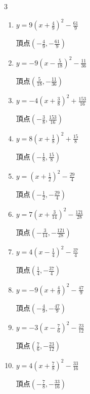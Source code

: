\begin{multicols}{3}
\begin{enumerate}
  \item $\displaystyle y=9\left( x+\frac{4}{9}\right)^{2}-\frac{61}{9}$

        $\displaystyle 頂点\left( -\frac{4}{9} , -\frac{61}{9} \right)$

  \item $\displaystyle y=-9\left( x-\frac{5}{18}\right)^{2}-\frac{11}{36}$

        $\displaystyle 頂点\left( \frac{5}{18} , -\frac{11}{36} \right)$

  \item $\displaystyle y=-4\left( x+\frac{3}{8}\right)^{2}+\frac{153}{16}$

        $\displaystyle 頂点\left( -\frac{3}{8} , \frac{153}{16} \right)$

  \item $\displaystyle y=8\left( x+\frac{1}{8}\right)^{2}+\frac{15}{8}$

        $\displaystyle 頂点\left( -\frac{1}{8} , \frac{15}{8} \right)$

  \item $\displaystyle y=\left( x+\frac{1}{2}\right)^{2}-\frac{29}{4}$

        $\displaystyle 頂点\left( -\frac{1}{2} , -\frac{29}{4} \right)$

  \item $\displaystyle y=7\left( x+\frac{3}{14}\right)^{2}-\frac{121}{28}$

        $\displaystyle 頂点\left( -\frac{3}{14} , -\frac{121}{28} \right)$

  \item $\displaystyle y=4\left( x-\frac{1}{4}\right)^{2}-\frac{37}{4}$

        $\displaystyle 頂点\left( \frac{1}{4} , -\frac{37}{4} \right)$

  \item $\displaystyle y=-9\left( x+\frac{4}{9}\right)^{2}-\frac{47}{9}$

        $\displaystyle 頂点\left( -\frac{4}{9} , -\frac{47}{9} \right)$

  \item $\displaystyle y=-3\left( x-\frac{7}{6}\right)^{2}-\frac{23}{12}$

        $\displaystyle 頂点\left( \frac{7}{6} , -\frac{23}{12} \right)$

  \item $\displaystyle y=4\left( x+\frac{7}{8}\right)^{2}-\frac{33}{16}$

        $\displaystyle 頂点\left( -\frac{7}{8} , -\frac{33}{16} \right)$


\end{enumerate}
\end{multicols}
